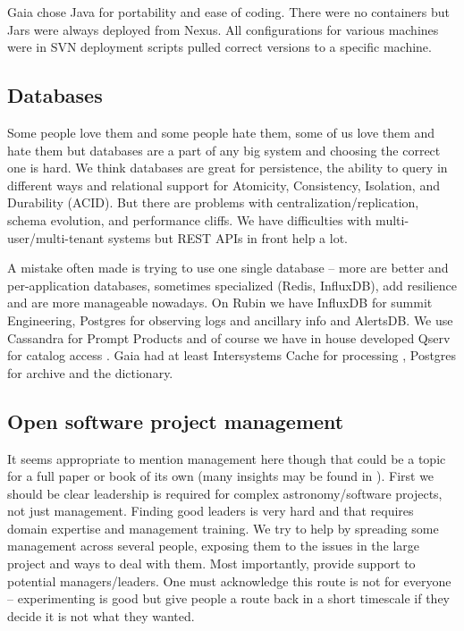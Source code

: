\documentclass[11pt,twoside]{article}
\begin{document}
Gaia chose Java for portability and ease of coding.
There were no containers but Jars were always deployed from Nexus.
All configurations for various machines were in SVN  deployment scripts pulled correct versions to a specific machine.

\subsection{Databases}
Some people love them and some people hate them, some of us love them and hate them but databases are a part of any big system and choosing the correct one is hard.
We think databases are great for persistence, the ability to query in different ways and relational support for Atomicity, Consistency, Isolation, and Durability (ACID).
But there are problems with centralization/replication, schema evolution, and performance cliffs.
We have  difficulties with multi-user/multi-tenant systems but
REST APIs in front help a lot.

A mistake often made is trying to use one single database --
more are better and per-application databases, sometimes specialized (Redis, InfluxDB), add resilience and are more manageable nowadays.
On Rubin we have InfluxDB for summit Engineering, Postgres for observing logs and ancillary info and AlertsDB.
We use Cassandra for Prompt Products and of course we have in house developed Qserv  for catalog access \citep{C15_adassxxxii}.
Gaia had at least Intersystems Cache for processing \citep{2011ExA....31..215O}, Postgres for archive and the dictionary.

\subsection{Open software project management}
It seems appropriate to mention management here though that could be a topic for a full paper or book of its own
(many insights may be found in \citet{OMULLANE2005}).
First we should be clear leadership is required for complex astronomy/software projects, not just management.
Finding good leaders is very hard and that requires domain expertise and management training.
We try to help by spreading some management across several people, exposing them to the issues in the large project and ways to deal with them.
Most importantly, provide support to potential managers/leaders.
One must  acknowledge this route is not for everyone  -- experimenting is good but give people a route back in a short timescale if they decide it is not what  they wanted.
\end{document}
